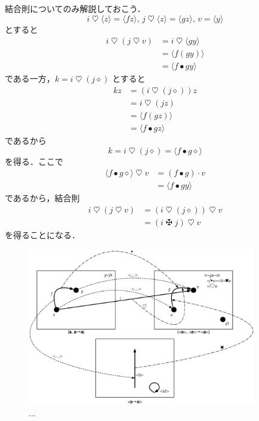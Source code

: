 \documentclass[a5paper,twoside,fleqn,draft]{jsbook}
\newcommand{\mAnonParam}{\diamond}
\DeclareMathOperator{\mBind}{\heartsuit}
\DeclareMathOperator{\mBindComp}{\maltese}
\DeclareMathOperator{\mComp}{\bullet}
\DeclareMathOperator{\mMap}{\cdot}
\newcommand{\mPureWith}[1]{\langle#1\rangle}
\begin{document}
結合則についてのみ解説しておこう．
\begin{equation}
i\mBind\mPureWith{z}=\mPureWith{fz},\,
j\mBind\mPureWith{z}=\mPureWith{gz},\,
v=\mPureWith{y}
\end{equation}
とすると
\begin{align}
i\mBind(j\mBind v)&=i\mBind\mPureWith{gy}\\
&=\mPureWith{f(gy)}\\
&=\mPureWith{f\mComp gy}
\end{align}
である一方，$k=i\mBind{}(j\mAnonParam)$ とすると
\begin{align}
kz&=(i\mBind(j\mAnonParam))z\\
&=i\mBind(jz)\\
&=\mPureWith{f(gz)}\\
&=\mPureWith{f\mComp gz}
\end{align}
であるから
\begin{equation}
k=i\mBind{}(j\mAnonParam)=\mPureWith{f\mComp g\mAnonParam}
\end{equation}
を得る．ここで
\begin{align}
\mPureWith{f\mComp g\mAnonParam}\mBind v
&=(f\mComp g)\mMap v\\
&=\mPureWith{f\mComp gy}
\end{align}
であるから，結合則
\begin{align}
  i\mBind{}(j\mBind v)
  &=(i\mBind{}(j\mAnonParam))\mBind v\\
  &=(i\mBindComp j)\mBind v
\end{align}
を得ることになる．

\begin{figure}
\begin{center}
\includegraphics[width=100mm]{fig/functor.eps}
\end{center}
\caption{...}
\label{fig:functor}
\end{figure}
\end{document}

